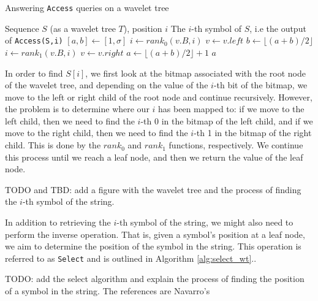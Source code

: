 \begin{algorithm}[h!]
    \caption{Answering \texttt{Access} queries on a wavelet tree}\label{alg:access_wt}
    \begin{algorithmic}
        \Require Sequence $S$ (as a wavelet tree $T$), position $i$
        \Ensure The $i$-th symbol of $S$, i.e the output of \texttt{Access(S,i)}
        \State $[a,b] \gets [1,\sigma]$
         
            \State $i \gets rank_0(v.B,i)$
            \State $v \gets v.left$ 
            \State $b \gets \lfloor (a+b)/2 \rfloor$
        \Else
            \State $i \gets rank_1(v.B,i)$
            \State $v \gets v.right$ 
            \State $a \gets \lfloor (a+b)/2 \rfloor +1$
        \EndIf
        \EndWhile
        \State \Return $a$
    \end{algorithmic}
\end{algorithm}

\noindent In order to find $S[i]$, we first look at the bitmap associated with the root node of the wavelet tree, and depending on the value of the $i$-th bit of the bitmap, we move to the left or right child of the root node and continue recursively. However, the problem is to determine where our $i$ has been mapped to: if we move to the left child, then we need to find the $i$-th 0 in the bitmap of the left child, and if we move to the right child, then we need to find the $i$-th 1 in the bitmap of the right child. This is done by the $rank_0$ and $rank_1$ functions, respectively. We continue this process until we reach a leaf node, and then we return the value of the leaf node.

\begin{example}
    TODO and TBD: add a figure with the wavelet tree and the process of finding the $i$-th symbol of the string.
\end{example}

\noindent In addition to retrieving the $i$-th symbol of the string, we might also need to perform the inverse operation. That is, given a symbol's position at a leaf node, we aim to determine the position of the symbol in the string. This operation is referred to as \texttt{Select} and is outlined in Algorithm \ref{alg:select_wt}..\vspace{0.4cm}

\noindent TODO: add the select algorithm and explain the process of finding the position of a symbol in the string. The references are Navarro's \cite{WTForALL,navarro2016compact} \vspace{0.4cm}

